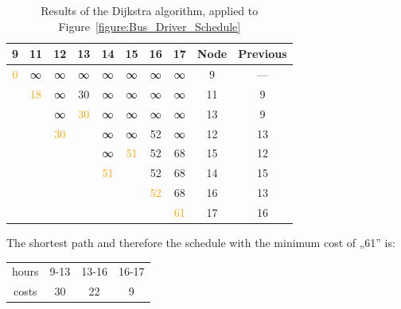 \documentclass[a4paper, 12pt]{article}
\newcommand{\highlight}[1]{\textcolor{orange}{#1}}
\begin{document}
\begin{table}[htbp]
    \caption{Results of the Dijkstra algorithm, applied to
             Figure~\ref{figure:Bus_Driver_Schedule}}
    \begin{center}
        \begin{tabular}{cccccccc|cc}

            9 & 11 & 12 & 13 & 14 & 15 & 16 & 17 & Node & Previous\\
            \hline
            \highlight{0}
              & ∞  & ∞  & ∞  & ∞  & ∞  & ∞  & ∞  & 9    & — \\

              & \highlight{18}
                   & ∞  & 30 & ∞  & ∞  & ∞  & ∞  & 11   & 9 \\

              &    & ∞  & \highlight{30}
                             & ∞  & ∞  & ∞  & ∞  & 13   & 9 \\

              &    & \highlight{30}
                        &    & ∞  & ∞  & 52 & ∞  & 12   & 13 \\

              &    &    &    & ∞  & \highlight{51}
                                       & 52 & 68 & 15   & 12 \\

              &    &    &    & \highlight{51}
                                  &    & 52 & 68 & 14   & 15 \\

              &    &    &    &    &    & \highlight{52}
                                            & 68 & 16   & 13 \\

              &    &    &    &    &    &    & \highlight{61}
                                                 & 17   & 16 \\
        \end{tabular}
    \end{center}
    \label{table:Label}
\end{table}

The shortest path and therefore the schedule with the minimum cost of „61” is:

\begin{center}
    \begin{tabular}{c|ccc}
        hours & 9-13 & 13-16 & 16-17\\
        costs & 30     & 22  & 9\\
    \end{tabular}
\end{center}


\titleformat{\section}{\sffamily\bfseries}{}{0pt}{}[{\color{aqua}\hrule}]
\printbibliography
\end{document}
